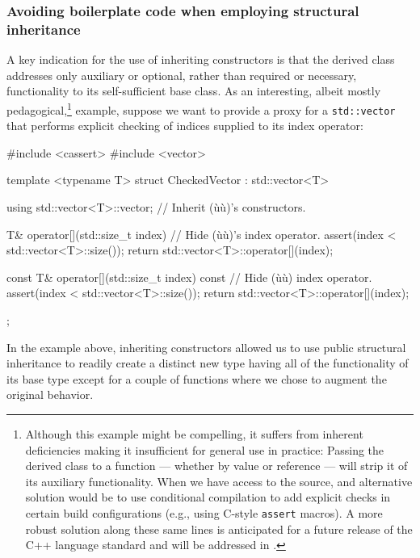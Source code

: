\subsubsection[Avoiding boilerplate code when employing structural inheritance]{Avoiding boilerplate code when employing structural inheritance}\label{avoiding-boilerplate-code-code-when-employing-structural-inheritance}

A key indication for the use of inheriting constructors is that the
derived class addresses only auxiliary or optional, rather than required
or necessary, functionality to its self-sufficient base class. As an
interesting, albeit mostly pedagogical,{\cprotect\footnote{Although this example might be compelling, it suffers from inherent deficiencies making it insufficient for general use in practice: Passing the derived class to a function --- whether by value or reference --- will
strip it of its auxiliary functionality. When we have access to the source, and alternative solution would be to use conditional compilation to add explicit checks in certain build configurations (e.g., using C-style \lstinline!assert! macros). A more robust solution along these same lines is anticipated for a future release of the C++ language standard and will be addressed in \cite{lakos23}.}} example, suppose we
want to provide a proxy for a \lstinline!std::vector! that performs
explicit checking of indices supplied to its index operator:

\begin{emcppslisting}[language=C++]
#include <cassert>                                                              
#include <vector>

template <typename T>
struct CheckedVector : std::vector<T>
{
    using std::vector<T>::vector;      // Inherit (ù{}ù)'s constructors.

    T& operator[](std::size_t index)   // Hide (ù{}ù)'s index operator.
    {
         assert(index < std::vector<T>::size());
         return std::vector<T>::operator[](index);
    }

    const T& operator[](std::size_t index) const  // Hide (ù{}ù) index operator.
    {
         assert(index < std::vector<T>::size());
         return std::vector<T>::operator[](index);
    }
};
\end{emcppslisting}
    
\noindent In the example above, inheriting constructors allowed us to use public
structural inheritance to readily create a distinct new type having
all of the functionality of its base type except for a couple of
functions where we chose to augment the original behavior.

